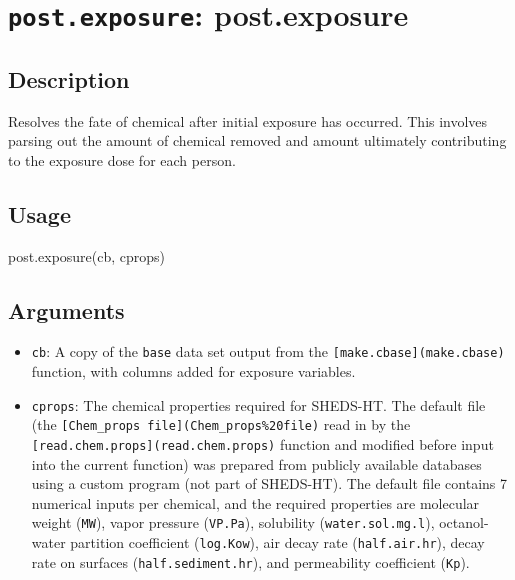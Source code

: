 \documentclass[
]{article}
\newenvironment{Shaded}{\begin{snugshade}}{\end{snugshade}}
\newcommand{\FunctionTok}[1]{\textcolor[rgb]{0.00,0.00,0.00}{#1}}
\newcommand{\NormalTok}[1]{#1}
\providecommand{\tightlist}{%
  \setlength{\itemsep}{0pt}\setlength{\parskip}{0pt}}
\begin{document}
\hypertarget{post.exposure-post.exposure}{%
\section{\texorpdfstring{\texttt{post.exposure}:
post.exposure}{post.exposure: post.exposure}}\label{post.exposure-post.exposure}}

\hypertarget{description-31}{%
\subsection{Description}\label{description-31}}

Resolves the fate of chemical after initial exposure has occurred. This
involves parsing out the amount of chemical removed and amount
ultimately contributing to the exposure dose for each person.

\hypertarget{usage-31}{%
\subsection{Usage}\label{usage-31}}

\begin{Shaded}
\begin{Highlighting}[]
\FunctionTok{post.exposure}\NormalTok{(cb, cprops)}
\end{Highlighting}
\end{Shaded}

\hypertarget{arguments-28}{%
\subsection{Arguments}\label{arguments-28}}

\begin{itemize}
\tightlist
\item
  \texttt{cb}: A copy of the \texttt{base} data set output from the
  \texttt{{[}make.cbase{]}(make.cbase)} function, with columns added for
  exposure variables.
\item
  \texttt{cprops}: The chemical properties required for SHEDS-HT. The
  default file (the
  \texttt{{[}Chem\_props\ file{]}(Chem\_props\%20file)} read in by the
  \texttt{{[}read.chem.props{]}(read.chem.props)} function and modified
  before input into the current function) was prepared from publicly
  available databases using a custom program (not part of SHEDS-HT). The
  default file contains 7 numerical inputs per chemical, and the
  required properties are molecular weight (\texttt{MW}), vapor pressure
  (\texttt{VP.Pa}), solubility (\texttt{water.sol.mg.l}), octanol-water
  partition coefficient (\texttt{log.Kow}), air decay rate
  (\texttt{half.air.hr}), decay rate on surfaces
  (\texttt{half.sediment.hr}), and permeability coefficient
  (\texttt{Kp}).
\end{itemize}
\end{document}
